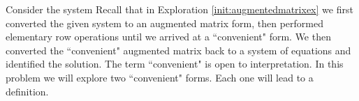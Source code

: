 \documentclass{ximera}
\begin{document}
\begin{exploration}\label{init:backsub}
Consider the system
Recall that in Exploration \ref{init:augmentedmatrixex} we first converted the given system to an augmented matrix form, then performed elementary row operations until we arrived at a ``convenient" form.  We then converted the ``convenient" augmented matrix back to a system of equations and identified the solution.  The term ``convenient" is open to interpretation.  In this problem we will explore two ``convenient" forms.  Each one will lead to a definition.  


\end{exploration}
\end{document}

